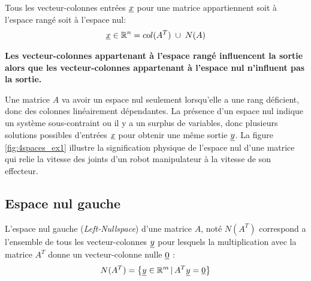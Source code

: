 Tous les vecteur-colonnes entrées $\underline{x}$ pour une matrice appartiennent soit à l'espace rangé soit à l'espace nul:
\begin{align}
\col{x} \in \re^n = col(A^T) \; \cup \; N(A) %
\end{align}

\textbf{Les vecteur-colonnes appartenant à l'espace rangé influencent la sortie alors que les vecteur-colonnes appartenant à l'espace nul n'influent pas la sortie.} 

Une matrice $A$ va avoir un espace nul seulement lorsqu'elle a une rang déficient, donc des colonnes linéairement dépendantes. La présence d'un espace nul indique un système sous-contraint ou il y a un surplus de variables, donc plusieurs solutions possibles d'entrées $\underline{x}$ pour obtenir une même sortie $\underline{y}$. 
%
%
La figure \ref{fig:4spaces_ex1} illustre la signification physique de l'espace nul d'une matrice qui relie la vitesse des joints d'un robot manipulateur à la vitesse de son effecteur. 

\subsection{Espace nul gauche}
\label{sec:leftnullspace}

L'espace nul gauche (\textit{Left-Nullspace}) d'une matrice $A$, noté $N(A^T)$ correspond a l'ensemble de tous les vecteur-colonnes $\underline{y}$ pour lesquels la multiplication avec la matrice $A^T$ donne un vecteur-colonne nulle $\underline{0}$ :
\begin{align}
N(A^T) = \left\{ \underline{y} \in \mathbb{R}^m \,|\, A^T\underline{y} = \underline{0} \right\}
\end{align}

